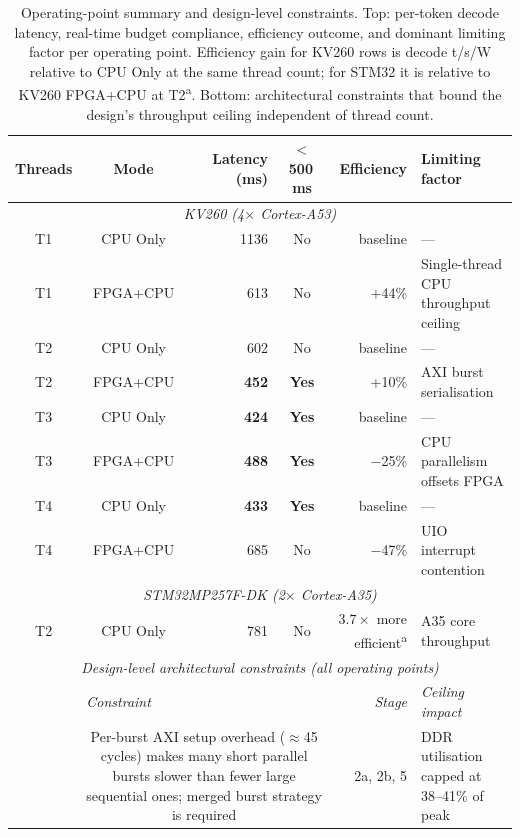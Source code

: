 \documentclass[manuscript,]{acmart} %
\begin{document}
\begin{table}[H]
\centering
\scriptsize
\caption{Operating-point summary and design-level constraints. Top: per-token decode latency, real-time budget compliance, efficiency outcome, and dominant limiting factor per operating point. Efficiency gain for KV260 rows is decode t/s/W relative to CPU Only at the same thread count; for STM32 it is relative to KV260 FPGA+CPU at T2\protect\textsuperscript{a}. Bottom: architectural constraints that bound the design's throughput ceiling independent of thread count.}
\label{tab:discussion_synthesis}
\setlength{\tabcolsep}{3pt}
\begin{tabular}{c c r c r p{2.8cm}}
\hline
Threads & Mode & Latency (ms) & $<$500\,ms & Efficiency & Limiting factor \\
\hline
\multicolumn{6}{c}{\itshape KV260 (4$\times$ Cortex-A53)} \\
\hline
T1 & CPU Only  & 1136 & No           & baseline  & — \\
T1 & FPGA+CPU  & 613  & No           & +44\%     & Single-thread CPU throughput ceiling \\
T2 & CPU Only  & 602  & No           & baseline  & — \\
T2 & FPGA+CPU  & \textbf{452}  & \textbf{Yes} & +10\%  & AXI burst serialisation \\
T3 & CPU Only  & \textbf{424}  & \textbf{Yes} & baseline  & — \\
T3 & FPGA+CPU  & \textbf{488}  & \textbf{Yes} & $-$25\%   & CPU parallelism offsets FPGA \\
T4 & CPU Only  & \textbf{433}  & \textbf{Yes} & baseline  & — \\
T4 & FPGA+CPU  & 685  & No           & $-$47\%   & UIO interrupt contention \\
\hline
\multicolumn{6}{c}{\itshape STM32MP257F-DK (2$\times$ Cortex-A35)} \\
\hline
T2 & CPU Only  & 781  & No           & $3.7{\times}$ more efficient\textsuperscript{a} & A35 core throughput \\
\hline
\multicolumn{6}{c}{\itshape Design-level architectural constraints (all operating points)} \\
\hline
\multicolumn{1}{l}{} & \multicolumn{3}{l}{\textit{Constraint}} & \textit{Stage} & \textit{Ceiling impact} \\
\hline
& \multicolumn{3}{p{5.5cm}}{Per-burst AXI setup overhead ($\approx$45 cycles) makes many short parallel bursts slower than fewer large sequential ones; merged burst strategy is required} & 2a, 2b, 5 & DDR utilisation capped at 38--41\% of peak \\

\end{tabular}
\end{table}
\end{document}
